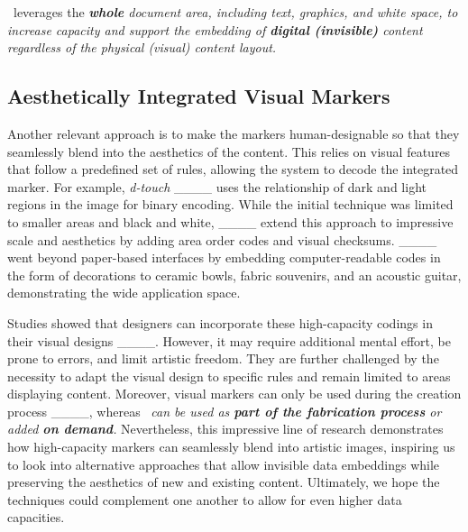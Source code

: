\systemName~leverages the \textit{\textbf{whole} document area, including text, graphics, and white space, to increase capacity and support the embedding of \textbf{digital (invisible)} content regardless of the physical (visual) content layout.}



\subsection{Aesthetically Integrated Visual Markers}
Another relevant approach is to make the markers human-designable so that they seamlessly blend into the aesthetics of the content.
This relies on visual features that follow a predefined set of rules, allowing the system to decode the integrated marker. 
For example, \textit{d-touch} ____ uses the relationship of dark and light regions in the image for binary encoding.
While the initial technique was limited to smaller areas and black and white, ____ extend this approach to impressive scale and aesthetics by adding area order codes and visual checksums.
____ went beyond paper-based interfaces by embedding computer-readable codes in the form of decorations to ceramic bowls, fabric souvenirs, and an acoustic guitar, demonstrating the wide application space.

Studies showed that designers can incorporate these high-capacity codings in their visual designs ____.
However, it may require additional mental effort, be prone to errors, and limit artistic freedom.
They are further challenged by the necessity to adapt the visual design to specific rules and remain limited to areas displaying content. Moreover, visual markers can only be used during the creation process ____, whereas \systemName~\textit{can be used as \textbf{part of the fabrication process} or added \textbf{on demand}.}
Nevertheless, this impressive line of research demonstrates how high-capacity markers can seamlessly blend into artistic images, inspiring us to look into alternative approaches that allow invisible data embeddings while preserving the aesthetics of new and existing content.
Ultimately, we hope the techniques could complement one another to allow for even higher data capacities.




